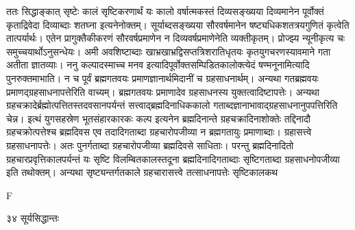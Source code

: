 \documentclass[11pt, openany]{book}
\begin{document}
\begin{sloppypar}

\noindent ततः सिद्धाङ्कात् सृष्टेः कालं सृष्टिकरणार्थं यः कालो वर्षात्मकस्तं दिव्यसङ्ख्यया दिव्यमानेन पूर्वोक्तं कृताद्रिवेदा दिव्याब्दाः शतघ्ना इत्यनेनोक्तम्। सूर्याब्दसङ्ख्यया सौरवर्षमानेन षष्ट्यधिकशतत्रयगुणितं कृत्वेति तात्पर्यार्थः। एतेन प्रागुक्तैकीकरणं सौरवर्षप्रमाणेन न दिव्यवर्षप्रमाणेनेति व्यक्तीकृतम्। प्रोज्झ्य न्यूनीकृत्य चः समुच्चयार्थोऽनुसन्धेयः। अमी अवशिष्टाब्दाः खाभ्रखाभ्रद्विसप्तत्रिशरातिधृतयः कृतयुगचरणस्यावमाने गता अतीता ज्ञातव्याः। ननु कल्पादस्माच्च मनव इत्यादिपूर्वोक्तसम्पिडितकालोक्त्येदं षण्मनूनामित्यादि पुनरुक्तमाभाति। न च पूर्वं ब्रह्मगतवयः प्रमाणज्ञानार्थमिदानीं च ग्रहसाधनार्थम्। अन्यथा गतब्रह्मवयः प्रमाणद्ग्रहसाधनापत्तेरिति वाच्यम्। ब्रह्मगतवयः प्रमाणादेव ग्रहसाधनस्य युक्तत्वादिष्टापत्तेः। अन्यथा ग्रहचक्रादेर्ब्रह्मोत्पत्तितस्तदवसानपर्यन्तं सत्त्वाद्ब्रह्मदिनाधिककालो गताब्दज्ञानाभावाद्ग्रहसाधनानुपपत्तिरिति चेन्न। इत्थं युगसहस्रेण भूतसंहारकारकः कल्प इत्यनेन ब्रह्मदिनान्ते ग्रहचक्रादिनाशोक्तेः तद्दिनादौ ग्रहचक्रोत्पत्तेश्च ब्रह्मदिवस एव तदादिगताब्दा ग्रहचारोपजीव्या न ब्रह्मगतायुः प्रमाणाब्दाः। ग्रहासत्त्वे ग्रहसाधनापत्तेः। अतः पुनर्गताब्दा ग्रहचारोपजीव्या ब्रह्मदिवसे साधिताः। परन्तु ब्रह्मदिनादितो ग्रहचारप्रवृत्तिकालपर्यन्तं यः सृष्टि विलम्बितकालस्तदूना ब्रह्मदिनादिगताब्दाः सृष्टिगताब्दा ग्रहसाधनोपजीव्या इति तथोक्तम्। अन्यथा सृष्ट्यन्तर्गतकाले ग्रहचारासत्त्वे तत्साधनापत्तेः सृष्टिकालकथ\textendash
\end{sloppypar}

{\tiny{F}}

\newpage

\noindent ३४ \hspace{4cm} सूर्यसिद्धान्तः
\vspace{1cm}
 
\end{document}
